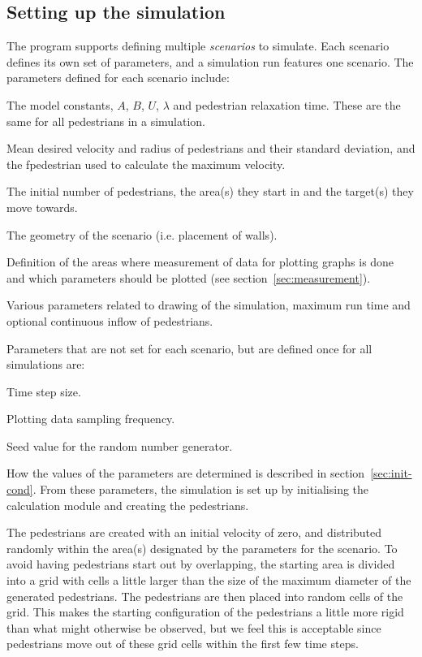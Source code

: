 \subsection{Setting up the simulation}
The program supports defining multiple \emph{scenarios} to simulate. Each 
scenario defines its own set of parameters, and a simulation run features one 
scenario. The parameters defined for each scenario include:

\begin{itemize*}
    \item The model constants, $A$, $B$, $U$, $\lambda$ and pedestrian relaxation 
        time. These are the same for all pedestrians in a simulation.
    \item Mean desired velocity and radius of pedestrians and their standard 
        deviation, and the fpedestrian used to calculate the maximum velocity.
    \item The initial number of pedestrians, the area(s) they start in and the 
        target(s) they move towards.
    \item The geometry of the scenario (i.e. placement of walls).
    \item Definition of the areas where measurement of data for plotting 
        graphs is done and which parameters should be plotted (see 
        section~\ref{sec:measurement}).
    \item Various parameters related to drawing of the simulation, maximum run 
        time and optional continuous inflow of pedestrians.
\end{itemize*}

Parameters that are not set for each scenario, but are defined once for all 
simulations are:

\begin{itemize*}
    \item Time step size.
    \item Plotting data sampling frequency.
    \item Seed value for the random number generator.
\end{itemize*}

How the values of the parameters are determined is described in 
section~\ref{sec:init-cond}. From these parameters, the simulation is set up 
by initialising the calculation module and creating the pedestrians.

The pedestrians are created with an initial velocity of zero, and distributed 
randomly within the area(s) designated by the parameters for the scenario. To 
avoid having pedestrians start out by overlapping, the starting area is divided 
into a grid with cells a little larger than the size of the maximum diameter 
of the generated pedestrians. The pedestrians are then placed into random cells of the 
grid. This makes the starting configuration of the pedestrians a little more rigid 
than what might otherwise be observed, but we feel this is acceptable since 
pedestrians move out of these grid cells within the first few time steps.

